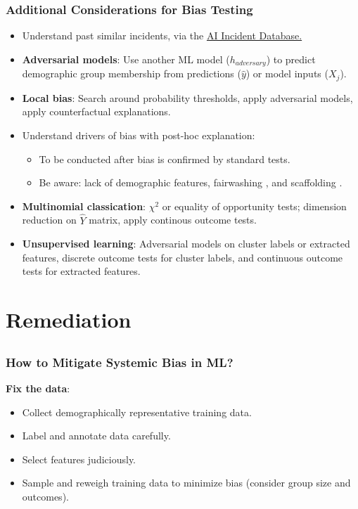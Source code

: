 \documentclass[11pt,aspectratio=169,hyperref={colorlinks}]{beamer}
\begin{document}
		\begin{frame}				
	
			\frametitle{Additional Considerations for Bias Testing}
	
			\begin{itemize}\small
				\item Understand past similar incidents, via the \href{https://incidentdatabase.ai/}{AI Incident Database.}	
				\item \textbf{Adversarial models}: Use another ML model ($h_{adversary}$) to predict demographic group membership from predictions 
				($\hat{y}$) or model inputs ($X_j$). 			
				\item \textbf{Local bias}: Search around probability thresholds, apply adversarial models, apply counterfactual explanations.
				\item Understand drivers of bias with post-hoc explanation:
				\begin{itemize}
					\item To be conducted after bias is confirmed by standard tests.
					\item Be aware: lack of demographic features, fairwashing \cite{fair_washing}, and scaffolding \cite{scaffolding}. 
				\end{itemize}
				\item \textbf{Multinomial classication}: $\chi^{2}$ or equality of opportunity tests; dimension reduction on $\hat{Y}$ matrix, apply continous outcome tests.
				\item \textbf{Unsupervised learning}: Adversarial models on cluster labels or extracted features, discrete outcome tests for cluster labels, and continuous outcome tests for extracted features.
			\end{itemize}
		\end{frame}
	
	\section{Remediation}
	
		\subsection*{}

		\begin{frame}			
		
			\frametitle{How to Mitigate Systemic Bias in ML?}
			\Large \textbf{Fix the data}:
			\begin{itemize} 
				\item Collect demographically representative training data.
				\item Label and annotate data carefully.
				\item Select features judiciously.
				\item Sample and reweigh training data to minimize bias (consider group size and outcomes).\cite{kamiran2012data}
			\end{itemize}
			
		\end{frame}	
		
\end{document}

